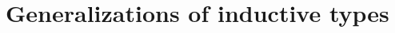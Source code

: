 \documentclass[hott-all.tex]{subfiles}
\begin{document}
% 
% 
% 
\section{Generalizations of inductive types}
% 
% 
% 
\end{document}
